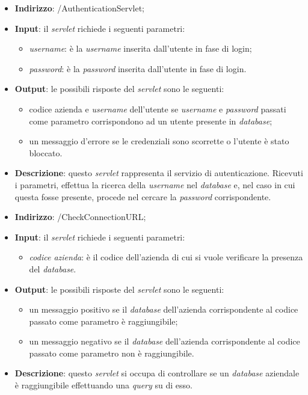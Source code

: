 
\begin{itemize}
	\item \textbf{Indirizzo}: /AuthenticationServlet;
	\item \textbf{Input}: il \textit{servlet} richiede i seguenti parametri:
		\begin{itemize}
			\item \textit{username}: è la \textit{username} inserita dall'utente in fase di login;
			\item \textit{password}: è la \textit{password} inserita dall'utente in fase di login.
		\end{itemize}
	\item \textbf{Output}: le possibili risposte del \textit{servlet} sono le seguenti:
		\begin{itemize}
			\item codice azienda e \textit{username} dell'utente se \textit{username} e \textit{password} passati come parametro corrispondono ad un utente presente in \textit{database};
			\item un messaggio d'errore se le credenziali sono scorrette o l'utente è stato bloccato. 
		\end{itemize}
		\item \textbf{Descrizione}: questo \textit{servlet} rappresenta il servizio di autenticazione. Ricevuti i parametri, effettua la ricerca della \textit{username} nel \textit{database} e, nel caso in cui questa fosse presente, procede nel cercare la \textit{password} corrispondente.
\end{itemize}

\begin{itemize}
	\item \textbf{Indirizzo}: /CheckConnectionURL;
	\item \textbf{Input}: il \textit{servlet} richiede i seguenti parametri:
		\begin{itemize}
			\item \textit{codice azienda}: è il codice dell'azienda di cui si vuole verificare la presenza del \textit{database}.
		\end{itemize}
	\item \textbf{Output}: le possibili risposte del \textit{servlet} sono le seguenti:
		\begin{itemize}
			\item un messaggio positivo se il \textit{database} dell'azienda corrispondente al codice passato come parametro è raggiungibile;
			\item un messaggio negativo se il \textit{database} dell'azienda corrispondente al codice passato come parametro non è raggiungibile.
		\end{itemize}
	\item \textbf{Descrizione}: questo \textit{servlet} si occupa di controllare se un \textit{database} aziendale è raggiungibile effettuando una \textit{query} su di esso.
\end{itemize}

